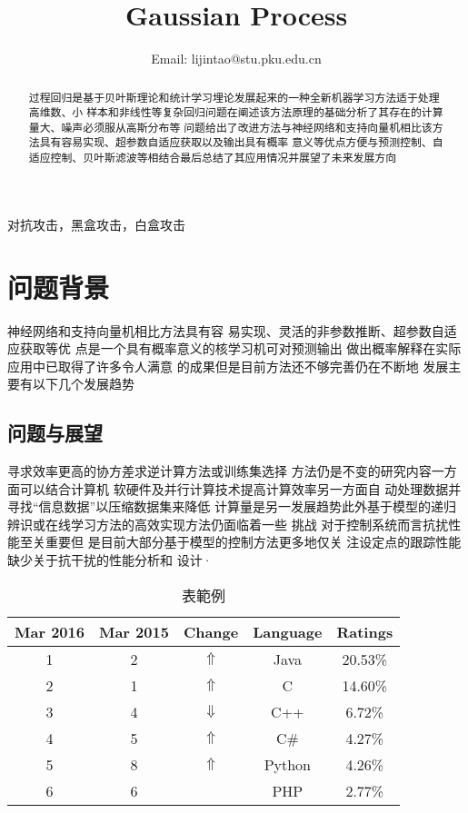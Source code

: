 \documentclass[conference,compsoc]{IEEEtran}
\begin{document}
\title{\LARGE{Gaussian Process}}
\author{
Email: lijintao@stu.pku.edu.cn}
\maketitle

\begin{abstract}
    过程回归是基于贝叶斯理论和统计学习埋论发展起来的一种全新机器学习方法适于处理高维数、小 样本和非线性等复杂回归问题在阐述该方法原理的基础分析了其存在的计算量大、噪声必须服从高斯分布等 问题给出了改进方法与神经网络和支持向量机相比该方法具有容易实现、超参数自适应获取以及输出具有概率 意义等优点方便与预测控制、自适应控制、贝叶斯滤波等相结合最后总结了其应用情况并展望了未来发展方向
\end{abstract}
\begin{IEEEkeywords}
    对抗攻击，黑盒攻击，白盒攻击
\end{IEEEkeywords}


\section{\textbf{问题背景}}
神经网络和支持向量机相比方法具有容 易实现、灵活的非参数推断、超参数自适应获取等优 点是一个具有概率意义的核学习机可对预测输出 做出概率解释在实际应用中已取得了许多令人满意 的成果但是目前方法还不够完善仍在不断地 发展主要有以下几个发展趋势
\subsection{问题与展望}
寻求效率更高的协方差求逆计算方法或训练集选择 方法仍是不变的研究内容一方面可以结合计算机 软硬件及并行计算技术提高计算效率另一方面自 动处理数据并寻找“信息数据”以压缩数据集来降低 计算量是另一发展趋势此外基于模型的递归 辨识或在线学习方法的高效实现方法仍面临着一些 挑战 对于控制系统而言抗扰性能至关重要但 是目前大部分基于模型的控制方法更多地仅关 注设定点的跟踪性能缺少关于抗干扰的性能分析和 设计·

\begin{table}[htbp]
  \caption{表範例}
  \begin{center}
  \begin{tabular}{ccccc}
  \hline
  \textbf{Mar 2016} & \textbf{Mar 2015} & \textbf{Change} & \textbf{Language} & \textbf{Ratings} \\
  \hline
  1 & 2 & $\Uparrow$   & Java   & 20.53\% \\
  \hline
  2 & 1 & $\Uparrow$   & C      & 14.60\% \\
  \hline
  3 & 4 & $\Downarrow$ & C++    & 6.72\%  \\
  \hline
  4 & 5 & $\Uparrow$   & C\#    & 4.27\%  \\
  \hline
  5 & 8 & $\Uparrow$   & Python & 4.26\%  \\
  \hline
  6 & 6 &              & PHP    & 2.77\%  \\
  \hline
  \end{tabular}
  \label{tab1}
  \end{center}
  \end{table}
\end{document}
